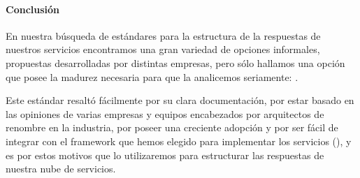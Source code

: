 \paragraph{Conclusión}

En nuestra búsqueda de estándares para la estructura de la respuestas de nuestros servicios encontramos una gran variedad de opciones informales, propuestas desarrolladas por distintas empresas, pero sólo hallamos una opción que posee la madurez necesaria para que la analicemos seriamente: .

Este estándar resaltó fácilmente por su clara documentación, por estar basado en las opiniones de varias empresas y equipos encabezados por arquitectos de renombre en la industria, por poseer una creciente adopción y por ser fácil de integrar con el framework que hemos elegido para implementar los servicios (), y es por estos motivos que lo utilizaremos para estructurar las respuestas de nuestra nube de servicios.
